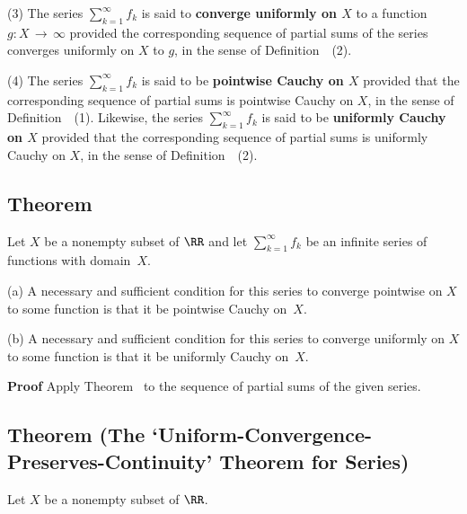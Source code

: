\V

        (3) The series $\sum_{k=1}^{{\infty}} f_{k}$ is said to {\bf converge uniformly on $X$} to a function $g:X \,{\rightarrow}\, {\infty}$
    provided the corresponding sequence of partial sums of the series converges uniformly on $X$ to $g$, in the sense of Definition~~(2).

\V

        (4) The series $\sum_{k=1}^{{\infty}} f_{k}$ is said to  be {\bf pointwise Cauchy on $X$}
    provided that the corresponding sequence of partial sums is pointwise Cauchy on $X$, in the sense of Definition~~(1).
    Likewise, the series $\sum_{k=1}^{{\infty}} f_{k}$ is said to  be {\bf uniformly Cauchy on $X$}
    provided that the corresponding sequence of partial sums is uniformly Cauchy on $X$, in the sense of Definition~~(2).

\V
\V


        \subsection{\small{{\bf Theorem}}}
        \label{ThmG60.30}

\V

        Let $X$ be a nonempty subset of ${\RR}$ and let $\sum_{k=1}^{{\infty}} f_{k}$ be an infinite series of functions with domain~$X$.

\V

        (a) A necessary and sufficient condition for this series to converge pointwise on $X$ to some function is that it be pointwise Cauchy on~$X$.

\V

        (b) A necessary and sufficient condition for this series to converge uniformly on $X$ to some function is that it be uniformly Cauchy on~$X$.

\V

        {\bf Proof} Apply Theorem~ to the sequence of partial sums of the given series.

\V


        \subsection{\small{{\bf Theorem}} (The `Uniform-Convergence-Preserves-Continuity' Theorem for Series)}
        \label{ThmG60.40}

\V

        Let $X$ be a nonempty subset of ${\RR}$.

